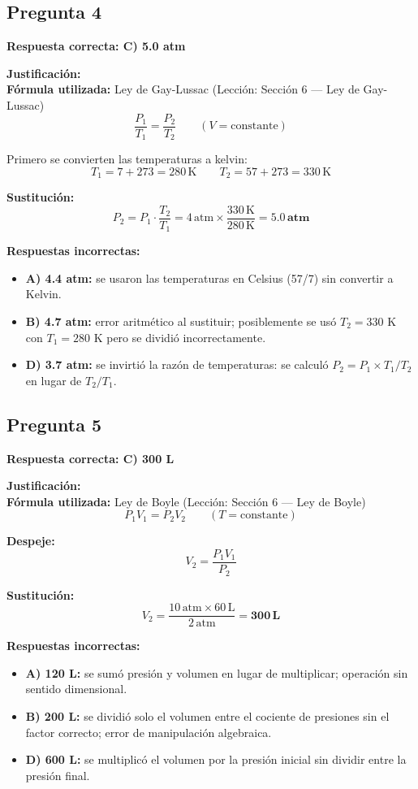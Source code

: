 \begin{respuestabox}
\subsection{Pregunta 4}
\textcolor{verdecorrecto}{\textbf{Respuesta correcta: C) 5.0 atm}}

\textbf{Justificación:}\\
\textbf{Fórmula utilizada:} Ley de Gay-Lussac (Lección: Sección 6 --- Ley de Gay-Lussac)
$$\frac{P_1}{T_1} = \frac{P_2}{T_2} \qquad (V = \text{constante})$$

Primero se convierten las temperaturas a kelvin:
$$T_1 = 7 + 273 = 280\,\text{K} \qquad T_2 = 57 + 273 = 330\,\text{K}$$

\textbf{Sustitución:}
$$P_2 = P_1 \cdot \frac{T_2}{T_1} = 4\,\text{atm} \times \frac{330\,\text{K}}{280\,\text{K}} = \mathbf{5.0\,\text{atm}}$$

\textbf{Respuestas incorrectas:}
\begin{itemize}
    \item \textbf{A) 4.4 atm:} se usaron las temperaturas en Celsius (57/7) sin convertir a Kelvin.
    \item \textbf{B) 4.7 atm:} error aritmético al sustituir; posiblemente se usó $T_2 = 330$ K con $T_1 = 280$ K pero se dividió incorrectamente.
    \item \textbf{D) 3.7 atm:} se invirtió la razón de temperaturas: se calculó $P_2 = P_1 \times T_1/T_2$ en lugar de $T_2/T_1$.
\end{itemize}
\end{respuestabox}

\begin{respuestabox}
\subsection{Pregunta 5}
\textcolor{verdecorrecto}{\textbf{Respuesta correcta: C) 300 L}}

\textbf{Justificación:}\\
\textbf{Fórmula utilizada:} Ley de Boyle (Lección: Sección 6 --- Ley de Boyle)
$$P_1 V_1 = P_2 V_2 \qquad (T = \text{constante})$$

\textbf{Despeje:}
$$V_2 = \frac{P_1 V_1}{P_2}$$

\textbf{Sustitución:}
$$V_2 = \frac{10\,\text{atm} \times 60\,\text{L}}{2\,\text{atm}} = \mathbf{300\,\text{L}}$$

\textbf{Respuestas incorrectas:}
\begin{itemize}
    \item \textbf{A) 120 L:} se sumó presión y volumen en lugar de multiplicar; operación sin sentido dimensional.
    \item \textbf{B) 200 L:} se dividió solo el volumen entre el cociente de presiones sin el factor correcto; error de manipulación algebraica.
    \item \textbf{D) 600 L:} se multiplicó el volumen por la presión inicial sin dividir entre la presión final.
\end{itemize}
\end{respuestabox}

